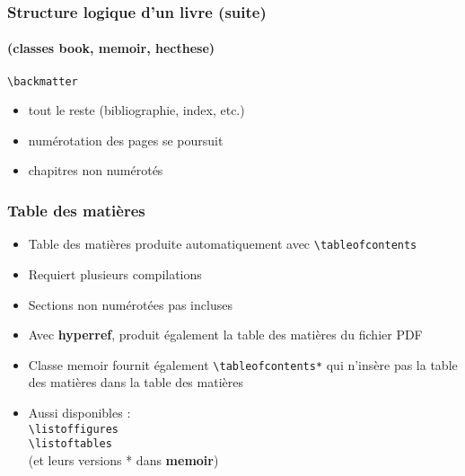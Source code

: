 
\begin{frame}[c,fragile]

	\frametitle{Structure logique d'un livre (suite)}
	\framesubtitle{(classes book, memoir, hecthese)}
	
	\lstinline|\backmatter|
	
	\begin{itemize}
		\item tout le reste (bibliographie, index, etc.)
		\item numérotation des pages se poursuit
		\item chapitres non numérotés
	\end{itemize}
\end{frame}


\begin{frame}[fragile]

	\frametitle{Table des matières}
	
	\begin{itemize}
		\item Table des matières produite automatiquement avec \lstinline|\tableofcontents|
		\item Requiert plusieurs compilations
		\item Sections non numérotées pas incluses
		\item Avec \textbf{hyperref}, produit également la table des matières du fichier PDF
		
		\pause
		
		\item Classe memoir fournit également \lstinline|\tableofcontents*| qui n’insère pas la table des matières dans la table des matières
		
		\pause
		
		\item Aussi disponibles : \\
		\lstinline|\listoffigures| \\
		\lstinline|\listoftables| \\
		(et leurs versions * dans \textbf{memoir})
	\end{itemize}
\end{frame}


